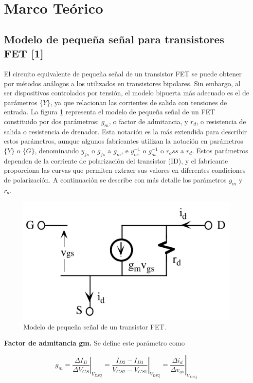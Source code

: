 \documentclass[12pt, a4paper]{article}
\begin{document}
    \newpage

    \section{Marco Teórico}

    \subsection{Modelo de pequeña señal para transistores FET [1]}

    El circuito equivalente de pequeña señal de un transistor FET se puede obtener por métodos análogos a los utilizados en transistores bipolares. Sin embargo, al ser dispositivos controlados por tensión, el modelo bipuerta más adecuado es el de parámetros $\{Y\}$, ya que relacionan las corrientes de salida con tensiones de entrada. La figura \ref{fig:mt1} representa el modelo de pequeña señal de un FET constituido por dos parámetros: $g_m$, o factor de admitancia, y $r_d$, o resistencia de salida o resistencia de drenador. Esta notación es la más extendida para describir estos parámetros, aunque algunos fabricantes utilizan la notación en parámetros $\{Y\}$ o $\{G\}$, denominando $y_{fs}$ o $g_{fs}$ a $g_m$, e $y_{os}^{-1}$ o $g_{os}^{-1}$ o $r_oss$ a $r_d$. Estos parámetros dependen de la corriente de polarización del transistor (ID), y el fabricante proporciona las curvas que permiten extraer sus valores en diferentes condiciones de polarización. A continuación se describe con más detalle los parámetros $g_m$ y $r_d$.

    \begin{figure}[h!]
        \centering
        \includegraphics[height=5cm\textwidth]{pequenasenal.jpg}
        \caption{Modelo de pequeña señal de un transistor FET.}
        \label{fig:mt1}
    \end{figure}

    {\bf Factor de admitancia gm.} Se define este parámetro como

    \begin{equation} \label{eqgm}
        g_m = \left.\frac{\Delta I_D}{\Delta V_{GS}}\right|_{V_{DSQ}} = \left.\frac{I_{D2}-I_{D1}}{V_{GS2}-V_{GS1}}\right|_{V_{DSQ}} = \left.\frac{\Delta i_d}{\Delta v_{gs}}\right|_{V_{DSQ}}
    \end{equation}
\end{document}
